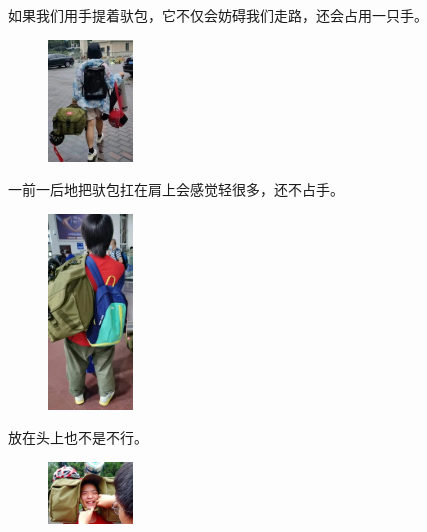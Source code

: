\documentclass{ctexbook}
\begin{document}
\begin{tcolorbox}[title=怎样背驮包]
如果我们用手提着驮包，它不仅会妨碍我们走路，还会占用一只手。
        \begin{figure}[H]
            \begin{center}
            \includegraphics[width=0.2\textwidth]{fig/菁宏驮包}
            \end{center}
        \end{figure}
一前一后地把驮包扛在肩上会感觉轻很多，还不占手。
        \begin{figure}[H]
            \begin{center}
            \includegraphics[width=0.2\textwidth]{fig/王上林驮包}
            \end{center}
        \end{figure}
放在头上也不是不行。       
        \begin{figure}[H]
            \begin{center}
            \includegraphics[width=0.2\textwidth]{fig/林琛宇驮包}
            \end{center}
        \end{figure}
\end{tcolorbox}
\end{document}
